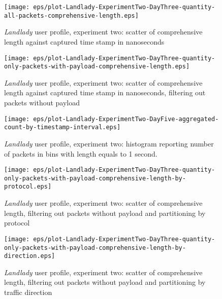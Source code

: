 \documentclass[10pt,a4paper]{article}
\begin{document}
    \begin{figure}
      \centering
      \texttt{[image: eps/plot-Landlady-ExperimentTwo-DayThree-quantity-all-packets-comprehensive-length.eps]}
      \caption{\emph{Landlady} user profile, experiment two: scatter
        of comprehensive length against captured time stamp in
        nanoseconds}
      \label{fig:landlady-user-profile-exp-two-comprehensive-length-scatter}
    \end{figure}

    \begin{figure}
      \centering
      \texttt{[image: eps/plot-Landlady-ExperimentTwo-DayThree-quantity-only-packets-with-payload-comprehensive-length.eps]}
      \caption{\emph{Landlady} user profile, experiment two: scatter
        of comprehensive length against captured time stamp in
        nanoseconds, filtering out packets without payload}
      \label{fig:landlady-user-profile-exp-two-comprehensive-length-scatter-filtering-on-payload}
    \end{figure}
    
    \begin{figure}
      \centering
      \texttt{[image: eps/plot-Landlady-ExperimentTwo-DayFive-aggregated-count-by-timestamp-interval.eps]}
      \caption{\emph{Landlady} user profile, experiment two: histogram
        reporting number of packets in bins with length equals to 1
        second.}
      \label{fig:landlady-user-profile-exp-two-count-histogram}
    \end{figure}

    \begin{figure}
      \centering
      \texttt{[image: eps/plot-Landlady-ExperimentTwo-DayThree-quantity-only-packets-with-payload-comprehensive-length-by-protocol.eps]}
      \caption{\emph{Landlady} user profile, experiment two: scatter
        of comprehensive length, filtering out packets without payload
        and partitioning by protocol}
      \label{fig:landlady-user-profile-exp-two-comprehensive-length-by-protocol}
    \end{figure}


    \begin{figure}
      \centering
      \texttt{[image: eps/plot-Landlady-ExperimentTwo-DayThree-quantity-only-packets-with-payload-comprehensive-length-by-direction.eps]}
      \caption{\emph{Landlady} user profile, experiment two: scatter
        of comprehensive length, filtering out packets without payload
        and partitioning by traffic direction}
      \label{fig:landlady-user-profile-exp-two-comprehensive-length-by-direction}
    \end{figure}
\end{document}
